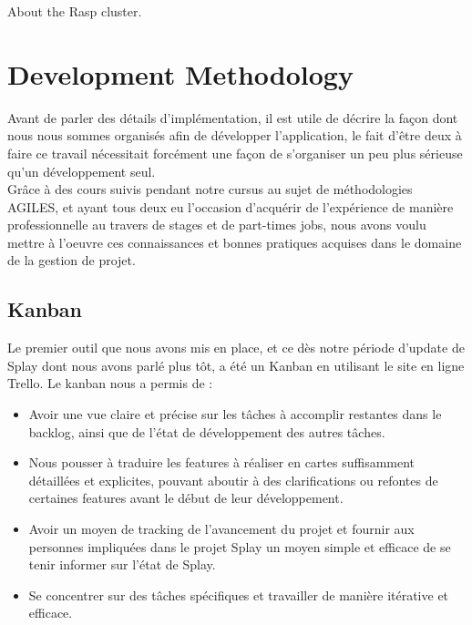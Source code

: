 \documentclass{eplmastersthesis}
\begin{document}
      About the Rasp cluster.

  \chapter{Development Methodology}

    Avant de parler des détails d'implémentation, il est utile de décrire la
    façon dont nous nous sommes organisés afin de développer l'application, le
    fait d'être deux à faire ce travail nécessitait forcément une façon de
    s'organiser un peu plus sérieuse qu'un développement seul.\\

    Grâce à des cours suivis pendant notre cursus au sujet de méthodologies
    AGILES, et ayant tous deux eu l'occasion d'acquérir de l'expérience de manière
    professionnelle au travers de stages et de part-times jobs, nous avons
    voulu mettre à l'oeuvre ces connaissances et bonnes pratiques acquises dans
    le domaine de la gestion de projet.

      \section{Kanban}

        Le premier outil que nous avons mis en place, et ce dès notre période
        d'update de Splay dont nous avons parlé plus tôt, a été un Kanban en
        utilisant le site en ligne Trello. Le kanban nous a permis de : \\

        \begin{itemize}
          \item Avoir une vue claire et précise sur les tâches à accomplir restantes
          dans le backlog, ainsi que de l'état de développement des autres tâches.
          \item Nous pousser à traduire les features à réaliser en cartes
          suffisamment détaillées et explicites, pouvant aboutir à des clarifications
          ou refontes de certaines features avant le début de leur développement.
          \item Avoir un moyen de tracking de l'avancement du projet et fournir aux
           personnes impliquées dans le projet Splay un moyen simple et efficace
           de se tenir informer sur l'état de Splay.
          \item Se concentrer sur des tâches spécifiques et travailler de manière
          itérative et efficace.
        \end{itemize}
\end{document}
